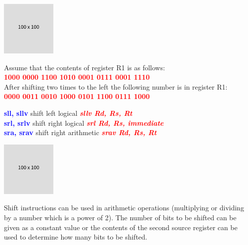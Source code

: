 \documentclass[
  14pt,
  a4paper,
  DIV=11,
  numbers=noendperiod,
  headinclude=true,
  footinclude=true]{scrreprt}
\begin{document}
\begin{tcolorbox}[colback=boxbodycol, colframe=boxheadcol, colbacktitle=boxheadcol, title=Shift operations, coltitle=boxtitlecol]

\includegraphics{index_files/mediabag/FiKGhYhhIWJYiBgWIoaF.png}

\begin{tcolorbox}[oversize, left=11pt, right=11pt, colback=boxbodycol2, colframe=boxheadcol2, title=Example, coltitle=boxtitlecol2, colbacktitle=boxheadcol2]
Assume that the contents of register R1 is as follows:\\
\textcolor{red}{\textbf{1000 0000 1100 1010 0001 0111 0001 1110}}\\
After shifting two times to the left the following number is in register
R1:\\
\textcolor{red}{\textbf{0000 0011 0010 1000 0101 1100 0111 1000}}

\end{tcolorbox}

\end{tcolorbox}

\begin{tcolorbox}[colback=boxbodycol3, colframe=boxbodycol3]
\textcolor{blue}{\textbf{sll, sllv}} shift left logical
\textcolor{red}{\textbf{\emph{sllv Rd, Rs, Rt}}}\\
\textcolor{blue}{\textbf{srl, srlv}} shift right logical
\textcolor{red}{\textbf{\emph{srl Rd, Rs, immediate}}}\\
\textcolor{blue}{\textbf{sra, srav}} shift right arithmetic
\textcolor{red}{\textbf{\emph{srav Rd, Rs, Rt}}}

\end{tcolorbox}

\includegraphics{index_files/mediabag/FiKGhYhhIWJYiBgWIoaF.png}

\begin{tcolorbox}[colback=boxbodycol, colframe=boxbodycol]
Shift instructions can be used in arithmetic operations (multiplying or
dividing by a number which is a power of 2). The number of bits to be
shifted can be given as a constant value or the contents of the second
source register can be used to determine how many bits to be shifted.

\end{tcolorbox}
\end{document}
